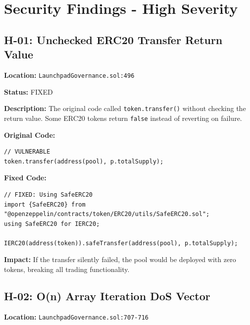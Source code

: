 \documentclass[11pt,a4paper]{article}
\begin{document}
\newpage

\section{Security Findings - High Severity}

\begin{highbox}
\subsection{H-01: Unchecked ERC20 Transfer Return Value}
\end{highbox}

\textbf{Location:} \texttt{LaunchpadGovernance.sol:496}

\textbf{Status:} \colorbox{low!30}{FIXED}

\textbf{Description:}
The original code called \texttt{token.transfer()} without checking the return value. Some ERC20 tokens return \texttt{false} instead of reverting on failure.

\textbf{Original Code:}
\begin{lstlisting}
// VULNERABLE
token.transfer(address(pool), p.totalSupply);
\end{lstlisting}

\textbf{Fixed Code:}
\begin{lstlisting}
// FIXED: Using SafeERC20
import {SafeERC20} from "@openzeppelin/contracts/token/ERC20/utils/SafeERC20.sol";
using SafeERC20 for IERC20;

IERC20(address(token)).safeTransfer(address(pool), p.totalSupply);
\end{lstlisting}

\textbf{Impact:} If the transfer silently failed, the pool would be deployed with zero tokens, breaking all trading functionality.

\vspace{1em}

\begin{highbox}
\subsection{H-02: O(n) Array Iteration DoS Vector}
\end{highbox}

\textbf{Location:} \texttt{LaunchpadGovernance.sol:707-716}
\end{document}

